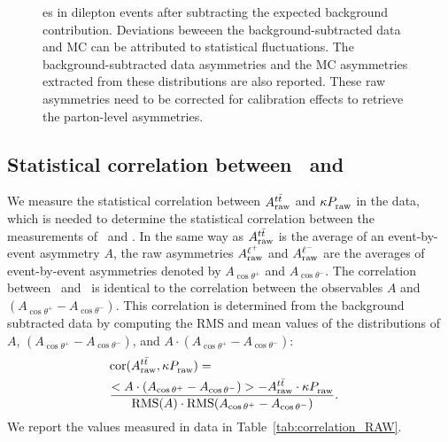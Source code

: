 \documentclass[aps,prd,twocolumn,showpacs,superscriptaddress,groupedaddress,floatfix]{revtex4}
\begin{document}
\begin{figure}[!ht]
{es in dilepton events after subtracting the expected background contribution. Deviations beweeen the background-subtracted data and MC can be attributed to statistical fluctuations.
The background-subtracted data asymmetries and the MC asymmetries extracted from these distributions are also reported. These raw asymmetries need to be corrected for calibration effects to retrieve the parton-level asymmetries.
\label{fig:sub_asymetry_COMB}}
 \end{figure}


\subsection{Statistical correlation between \Attraw\ and  \Pttraw }
\label{sec:correlation_measurement}
We measure the statistical correlation between $\Attraw$ and  $\Pttraw$ in the data, which
is needed to determine the statistical correlation between
the measurements of \Att\ and \Ptt.
In the same way as $ \Attraw$ is the average of an event-by-event asymmetry $A$,
the raw asymmetries $\AP{+}{\invisible{\rm beam,} {\rm raw}}$ and $\AP{-}{\invisible{\rm beam,} {\rm raw}}$ 
are the averages  of event-by-event asymmetries denoted by $A_{\cos\theta^+}$ and $A_{\cos\theta^-}$.
The correlation between \Attraw\ and \Pttraw\ is identical to the correlation between the observables $A$ and $(A_{\cos\theta^+}-A_{\cos\theta^-})$.
This  correlation is determined  from the background subtracted data by computing the RMS and mean values of the distributions of $A$,  $(A_{\cos\theta^+}-A_{\cos\theta^-})$, and 
 $A\cdot (A_{\cos\theta^+}-A_{\cos\theta^-})$: 
\begin{align}
& {\rm cor}(\Attraw, \Pttraw)=& \nonumber \\&
\frac{  < A\cdot (A_{\cos\theta^+}-A_{\cos\theta^-})  > - \Attraw\cdot\Pttraw   }
{ {\rm RMS}(A) \cdot {\rm RMS}(A_{\cos\theta^+}-A_{\cos\theta^-}) }
.\end{align}
We report the values measured in  data in Table~\ref{tab:correlation_RAW}.
\end{document}
